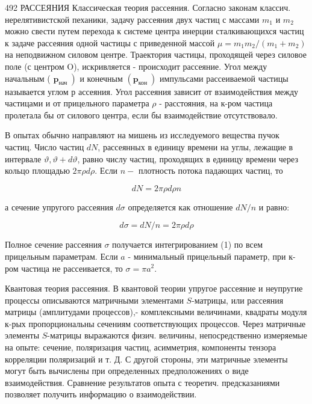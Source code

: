 \documentclass[10pt]{article}
\begin{document}
492 РАССЕЯНИЯ Классическая теория рассеяния. Согласно законам классич. нерелятивистской пеханики, задачу рассеяния двух частиц с массами $m_{1}$ и $m_{2}$ можно свести путем перехода к системе центра инерции сталкивающихся частиц к задаче рассеяния одной частицы с приведенной массой $\mu=m_{1} m_{2} /\left(m_{1}+m_{2}\right)$ на неподвижном силовом центре. Траектория частицы, проходящей через силовое поле (с центром O), искривляется - происходит рассеяние. Угол между начальным ( $\left.\boldsymbol{p}_{\text {нач }}\right)$ и конечным $\left(\boldsymbol{p}_{\text {кон }}\right)$ импульсами рассеиваемой частицы называется углом р ассеяния. Угол рассеяния зависит от взаимодействия между частицами и от прицельного параметра $\rho$ - расстояния, на к-ром частица пролетала бы от силового центра, если бы взаимодействие отсутствовало.



В опытах обычно направляют на мишень из исследуемого вещества пучок частиц. Число частиц $d N$, рассеянных в единицу времени на углы, лежащие в интервале $\vartheta, \vartheta+d \vartheta$, равно числу частиц, проходящих в единицу времени через кольцо площадью $2 \pi \rho d \rho$. Если $n-$ плотность потока падающих частиц, то



\[

d N=2 \pi \rho d \rho n

\]



а сечение упругого рассеяния $d \sigma$ определяется как отношение $d N / n$ и равно:



\[

d \sigma=d N / n=2 \pi \rho d \rho

\]



Полное сечение рассеяния $\sigma$ получается интегрированием (1) по всем прицельным параметрам. Если $a$ - минимальный прицельный параметр, при к-ром частица не рассеивается, то $\sigma=\pi a^{2}$.



Квантовая теория рассеяния. В квантовой теории упругое рассеяние и неупругие процессы описываются матричными элементами $S$-матрицы, или рассеяния матрицы (амплитудами процессов),- комплексными величинами, квадраты модуля к-рых пропорциональны сечениям соответствующих процессов. Через матричные элементы $S$-матрицы выражаются физич. величины, непосредственно измеряемые на опыте: сечение, поляризация частиц, асимметрия, компоненты тензора корреляции поляризаций и т. Д. С другой стороны, эти матричные элементы могут быть вычислены при определенных предположениях о виде взаимодействия. Сравнение результатов опыта с теоретич. предсказаниями позволяет получить информацию о взаимодействии.
\end{document}
